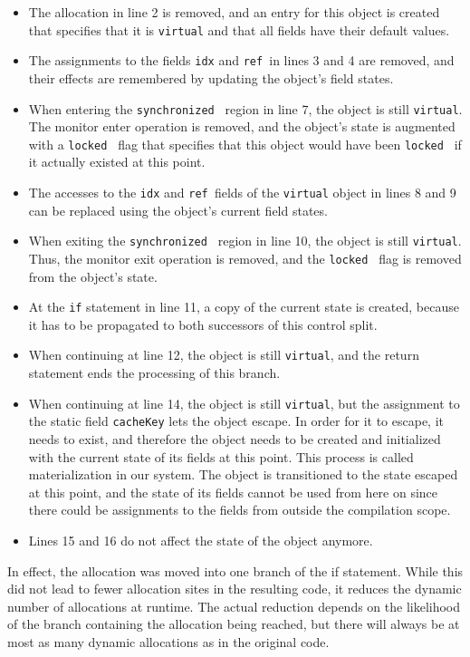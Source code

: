 \begin{itemize}

\item The allocation in line 2 is removed, and an entry for
this object is created that specifies that it is \texttt{virtual}
and that all fields have their default values.
\item The assignments to the fields \texttt{idx} and \texttt{ref }in lines 3
and 4 are removed, and their effects are remembered
by updating the object’s field states.
\item When entering the \texttt{synchronized } region in line 7, the
object is still \texttt{virtual}. The monitor enter operation is
removed, and the object’s state is augmented with a
\texttt{locked } flag that specifies that this object would have
been \texttt{locked } if it actually existed at this point.
\item The accesses to the \texttt{idx} and \texttt{ref }fields of the \texttt{virtual}
object in lines 8 and 9 can be replaced using the object’s current field states.
\item When exiting the \texttt{synchronized } region in line 10, the
object is still \texttt{virtual}. Thus, the monitor exit operation is removed, and the \texttt{locked } flag is removed from
the object’s state.
\item At the \texttt{if} statement in line 11, a copy of the current
state is created, because it has to be propagated to
both successors of this control split.
\item  When continuing at line 12, the object is still \texttt{virtual},
and the return statement ends the processing of this
branch.
\item  When continuing at line 14, the object is still \texttt{virtual},
but the assignment to the static field \texttt{cacheKey} lets
the object escape. In order for it to escape, it needs
to exist, and therefore the object needs to be created
and initialized with the current state of its fields at
this point. This process is called materialization in
our system. The object is transitioned to the state
escaped at this point, and the state of its fields cannot
be used from here on since there could be assignments
to the fields from outside the compilation scope.
\item  Lines 15 and 16 do not affect the state of the object
anymore.
\end{itemize}


In effect, the allocation was moved into one branch of the
if statement. While this did not lead to fewer allocation
sites in the resulting code, it reduces the dynamic number
of allocations at runtime. The actual reduction depends on
the likelihood of the branch containing the allocation being
reached, but there will always be at most as many dynamic
allocations as in the original code.